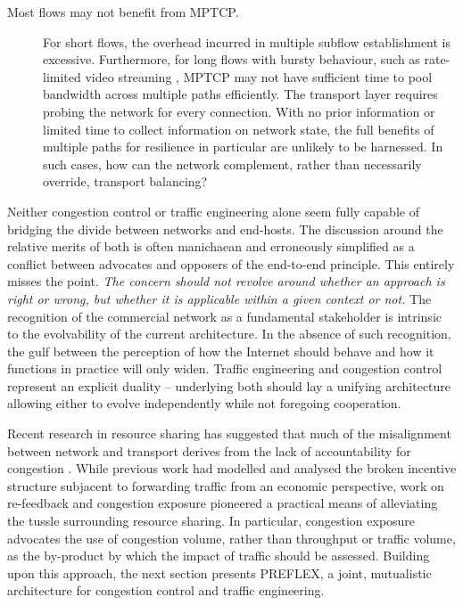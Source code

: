 \begin{description}
\item[Most flows may not benefit from \ac{MPTCP}.]{
    For short flows, the overhead incurred in multiple subflow establishment is excessive.
    Furthermore, for long flows with bursty behaviour, such as rate-limited video streaming \cite{Rao:2011p547}, \ac{MPTCP} may not have sufficient time to pool bandwidth across multiple paths efficiently.
    The transport layer requires probing the network for every connection. 
    With no prior information or limited time to collect information on network state, the full benefits of multiple paths for resilience in particular are unlikely to be harnessed.
    In such cases, how can the network complement, rather than necessarily override, transport balancing?
}

\end{description}

Neither congestion control or traffic engineering alone seem fully capable of bridging the divide between networks and end-hosts. 
The discussion around the relative merits of both is often manichaean and erroneously simplified as a conflict between advocates and opposers of the end-to-end principle. 
This entirely misses the point.
\textit{The concern should not revolve around whether an approach is right or wrong, but whether it is applicable within a given context or not.}
The recognition of the commercial network as a fundamental stakeholder is intrinsic to the evolvability of the current architecture. 
In the absence of such recognition, the gulf between the perception of how the Internet should behave and how it functions in practice will only widen. 
Traffic engineering and congestion control represent an explicit duality -- underlying both should lay a unifying architecture allowing either to evolve independently while not foregoing cooperation.

Recent research in resource sharing has suggested that much of the misalignment between network and transport derives from the lack of accountability for congestion \cite{Briscoe:2007p261}.
While previous work had modelled and analysed the broken incentive structure subjacent to forwarding traffic from an economic perspective, work on re-feedback and congestion exposure \cite{Briscoe:2005p346} pioneered a practical means of alleviating the tussle surrounding resource sharing.  
In particular, congestion exposure advocates the use of congestion volume, rather than throughput or traffic volume, as the by-product by which the impact of traffic should be assessed.  
Building upon this approach, the next section presents PREFLEX, a joint, mutualistic architecture for congestion control and traffic engineering. 

